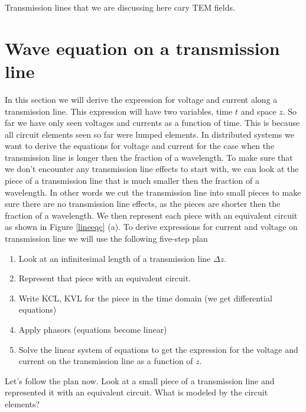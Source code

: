 \documentclass{ximera}
\begin{document}
Transmission lines that we are discussing  here cary TEM fields.


\section{ Wave equation on a transmission line}\label{telegrapher}

In this section we will derive the expression for voltage and current
along a transmission line. This expression will have two variables, time $t$ and space $z$. 
So far we have only seen voltages and currents  as a function of time.  This is because all circuit elements seen so far were lumped elements. In distributed systems
we want to derive the equations for voltage and current for the case when the transmission
line is longer then the fraction of a wavelength.  To make sure that we
don't encounter any  transmission line effects to start with, we can
look at the piece of a transmission line that is much smaller then
the fraction of a wavelength. In other words we cut the transmission
line into small pieces to make sure there are no transmission line
effects, as the pieces are shorter then the fraction of a wavelength. We then represent each piece with
an equivalent circuit as shown in Figure \ref{lineeqc} (a). 
To derive expressions for current and voltage on transmission line we will use the following five-step plan

\begin{enumerate}
\item Look at an infinitesimal length of a transmission line $\Delta z$.  

\item Represent that piece with an equivalent circuit. 

\item Write KCL, KVL for the piece in the time domain (we get
differential equations)

\item Apply phasors (equations become linear)

\item Solve the linear system of equations to get the expression for
the voltage and current on the transmission line as a function of $z$.

\end{enumerate}


Let's follow the plan now. Look at a small piece of a transmission line and represented it with an equivalent circuit. What is
modeled by the circuit elements?
\end{document}
